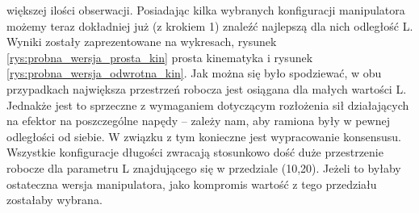 \documentclass[printmode]{mgr}
\begin{document}
większej ilości obserwacji. Posiadając kilka wybranych konfiguracji manipulatora możemy teraz dokładniej już (z krokiem 1) znaleźć
najlepszą dla nich odległość L. Wyniki zostały zaprezentowane na wykresach, rysunek \ref{rys:probna_wersja_prosta_kin} prosta kinematyka
i rysunek \ref{rys:probna_wersja_odwrotna_kin}. Jak można się było spodziewać, w obu przypadkach największa przestrzeń robocza jest
osiągana dla małych wartości L. Jednakże jest to sprzeczne z wymaganiem dotyczącym rozłożenia sił działających na efektor na
poszczególne napędy -- zależy nam, aby ramiona były w pewnej odległości od siebie. W związku z tym konieczne jest wypracowanie konsensusu.
Wszystkie konfiguracje długości zwracają stosunkowo dość duże przestrzenie robocze dla parametru L znajdującego się w przedziale (10,20).
Jeżeli to byłaby ostateczna wersja manipulatora, jako kompromis wartość z tego przedziału zostałaby wybrana.
\end{document}
